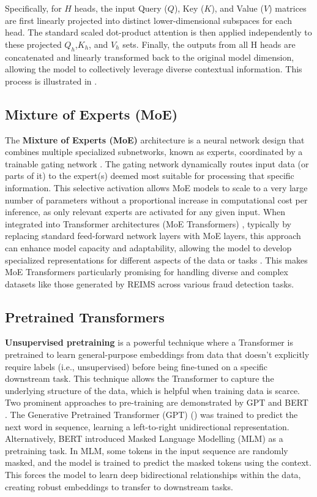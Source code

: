 Specifically, for $H$ heads, the input Query ($Q$), Key ($K$), and Value ($V$) matrices are first linearly projected into distinct lower-dimensional subspaces for each head. The standard scaled dot-product attention is then applied independently to these projected $Q_h$,$K_h$, and $V_h$ sets. Finally, the outputs from all H heads are concatenated and linearly transformed back to the original model dimension, allowing the model to collectively leverage diverse contextual information. This process is illustrated in .

\subsection{Mixture of Experts (MoE)}

The \textbf{Mixture of Experts (MoE)} architecture is a neural network design that combines multiple specialized subnetworks, known as experts, coordinated by a trainable gating network \citep{Jacobs1991}. The gating network dynamically routes input data (or parts of it) to the expert(s) deemed most suitable for processing that specific information. This selective activation allows MoE models to scale to a very large number of parameters without a proportional increase in computational cost per inference, as only relevant experts are activated for any given input. When integrated into Transformer architectures (MoE Transformers) \citep{Kaiser2017,Guo2025,Jaech2024}, typically by replacing standard feed-forward network layers with MoE layers, this approach can enhance model capacity and adaptability, allowing the model to develop specialized representations for different aspects of the data or tasks \citep{Kaiser2017}. This makes MoE Transformers particularly promising for handling diverse and complex datasets like those generated by REIMS across various fraud detection tasks.

\subsection{Pretrained Transformers}

\textbf{Unsupervised pretraining} is a powerful technique where a Transformer is pretrained to learn general-purpose embeddings from data that doesn't explicitly require labels (i.e., unsupervised) before being fine-tuned on a specific downstream task. This technique allows the Transformer to capture the underlying structure of the data, which is helpful when training data is scarce. Two prominent approaches to pre-training are demonstrated by GPT \citep{Radford2018} and BERT \citep{Devlin2018}. The Generative Pretrained Transformer (GPT) (\citep{Radford2018}) was trained to predict the next word in sequence, learning a left-to-right unidirectional representation. Alternatively, BERT \citep{Devlin2018} introduced Masked Language Modelling (MLM) as a pretraining task. In MLM, some tokens in the input sequence are randomly masked, and the model is trained to predict the masked tokens using the context. This forces the model to learn deep bidirectional relationships within the data, creating robust embeddings to transfer to downstream tasks.

